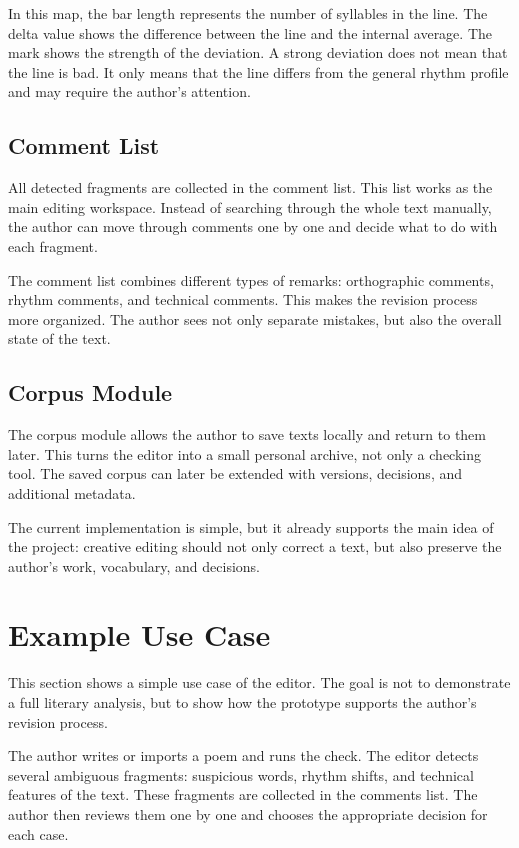 \documentclass[sigconf]{acmart}
\begin{document}
In this map, the bar length represents the number of syllables in the line. The delta value shows the difference between the line and the internal average. The mark shows the strength of the deviation. A strong deviation does not mean that the line is bad. It only means that the line differs from the general rhythm profile and may require the author's attention.

\subsection{Comment List}

All detected fragments are collected in the comment list. This list works as the main editing workspace. Instead of searching through the whole text manually, the author can move through comments one by one and decide what to do with each fragment.

The comment list combines different types of remarks: orthographic comments, rhythm comments, and technical comments. This makes the revision process more organized. The author sees not only separate mistakes, but also the overall state of the text.

\subsection{Corpus Module}

The corpus module allows the author to save texts locally and return to them later. This turns the editor into a small personal archive, not only a checking tool. The saved corpus can later be extended with versions, decisions, and additional metadata.

The current implementation is simple, but it already supports the main idea of the project: creative editing should not only correct a text, but also preserve the author's work, vocabulary, and decisions.

\section{Example Use Case}

This section shows a simple use case of the editor. The goal is not to demonstrate a full literary analysis, but to show how the prototype supports the author's revision process.

The author writes or imports a poem and runs the check. The editor detects several ambiguous fragments: suspicious words, rhythm shifts, and technical features of the text. These fragments are collected in the comments list. The author then reviews them one by one and chooses the appropriate decision for each case.
\end{document}
